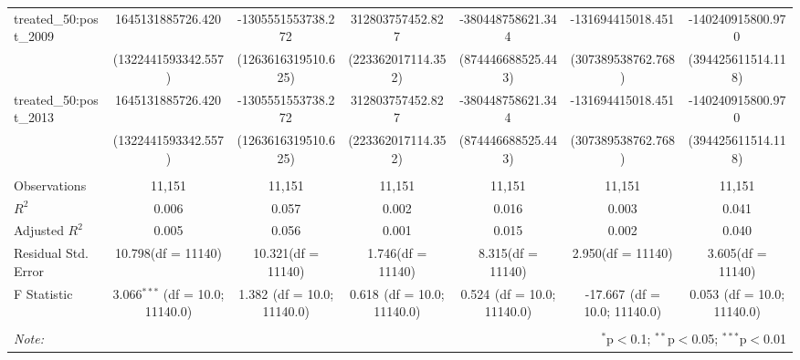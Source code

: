 \begin{table}[!htbp]
\begin{tabular}{@{\extracolsep{5pt}}lcccccc}
 treated_50:post_2009 & 1645131885726.420$^{}$ & -1305551553738.272$^{}$ & 312803757452.827$^{}$ & -380448758621.344$^{}$ & -131694415018.451$^{}$ & -140240915800.970$^{}$ \\
  & (1322441593342.557) & (1263616319510.625) & (223362017114.352) & (874446688525.443) & (307389538762.768) & (394425611514.118) \\
 treated_50:post_2013 & 1645131885726.420$^{}$ & -1305551553738.272$^{}$ & 312803757452.827$^{}$ & -380448758621.344$^{}$ & -131694415018.451$^{}$ & -140240915800.970$^{}$ \\
  & (1322441593342.557) & (1263616319510.625) & (223362017114.352) & (874446688525.443) & (307389538762.768) & (394425611514.118) \\
\hline \\[-1.8ex]
 Observations & 11,151 & 11,151 & 11,151 & 11,151 & 11,151 & 11,151 \\
 $R^2$ & 0.006 & 0.057 & 0.002 & 0.016 & 0.003 & 0.041 \\
 Adjusted $R^2$ & 0.005 & 0.056 & 0.001 & 0.015 & 0.002 & 0.040 \\
 Residual Std. Error & 10.798(df = 11140) & 10.321(df = 11140) & 1.746(df = 11140) & 8.315(df = 11140) & 2.950(df = 11140) & 3.605(df = 11140)  \\
 F Statistic & 3.066$^{***}$ (df = 10.0; 11140.0) & 1.382$^{}$ (df = 10.0; 11140.0) & 0.618$^{}$ (df = 10.0; 11140.0) & 0.524$^{}$ (df = 10.0; 11140.0) & -17.667$^{}$ (df = 10.0; 11140.0) & 0.053$^{}$ (df = 10.0; 11140.0) \\
\hline
\hline \\[-1.8ex]
\textit{Note:} & \multicolumn{6}{r}{$^{*}$p$<$0.1; $^{**}$p$<$0.05; $^{***}$p$<$0.01} \\
\end{tabular}
\end{table}